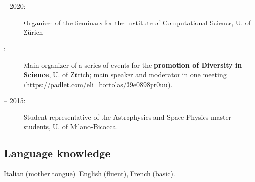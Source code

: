 \begin{description}

    \item[  -- 2020:] Organizer of the Seminars for the Institute of Computational Science, U. of Z\"urich
    
    \item[ :] Main organizer of a series of  events  for the \textbf{promotion of Diversity in Science}, U. of Z\"urich; main speaker and moderator in one meeting (\href{https://padlet.com/eli_bortolas/39e0898pr0uu}{https://padlet.com/eli\_bortolas/39e0898pr0uu}).

    \item[  -- 2015:] Student representative of the Astrophysics and Space Physics master students, U. of Milano-Bicocca.
    
\end{description}


\subsection*{Language knowledge}
Italian (mother tongue), English (fluent), French (basic).%





